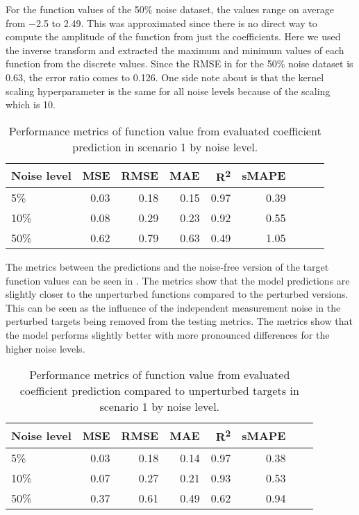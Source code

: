 \documentclass[preprint,12pt,times,authoryear]{elsarticle}
\begin{document}
For the function values of the 50\% noise dataset, the values range on average from \num{-2.5} to \num{2.49}. This was approximated since there is no direct way to compute the amplitude of the function from just the coefficients. Here we used the inverse transform and extracted the maximum and minimum values of each function from the discrete values. Since the RMSE in  for the 50\% noise dataset is \num{0.63}, the error ratio comes to \num{0.126}. One side note about  is that the kernel scaling hyperparameter is the same for all noise levels because of the scaling which is 10.
\begin{table}[H]
  \caption{Performance metrics of function value from evaluated coefficient prediction in scenario 1 by noise level.}\label{table:scenario_1_function_metrics}
  \centering
  \begin{tabular}{lrrrrrrrr}
    \toprule
    Noise level & MSE  & RMSE & MAE  & R\textsuperscript{2} & sMAPE \\
    \midrule
    5\%         & 0.03 & 0.18 & 0.15 & 0.97                 & 0.39  \\
    10\%        & 0.08 & 0.29 & 0.23 & 0.92                 & 0.55  \\
    50\%        & 0.62 & 0.79 & 0.63 & 0.49                 & 1.05  \\
    \bottomrule
  \end{tabular}
\end{table}

The metrics between the predictions and the noise-free version of the target function values can be seen in . The metrics show that the model predictions are slightly closer to the unperturbed functions compared to the perturbed versions. This can be seen as the influence of the independent measurement noise in the perturbed targets being removed from the testing metrics. The metrics show that the model performs slightly better with more pronounced differences for the higher noise levels.
\begin{table}[H]
  \caption{Performance metrics of function value from evaluated coefficient prediction compared to unperturbed targets in scenario 1 by noise level.}\label{table:scenario_1_clean_function_metrics}
  \centering
  \begin{tabular}{lrrrrrrr}
    \toprule
    Noise level & MSE  & RMSE & MAE  & R\textsuperscript{2} & sMAPE \\
    \midrule
    5\%         & 0.03 & 0.18 & 0.14 & 0.97                 & 0.38  \\
    10\%        & 0.07 & 0.27 & 0.21 & 0.93                 & 0.53  \\
    50\%        & 0.37 & 0.61 & 0.49 & 0.62                 & 0.94  \\
    \bottomrule
  \end{tabular}
\end{table}
\end{document}
